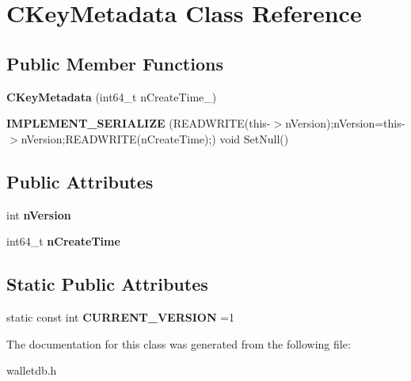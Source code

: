 \hypertarget{class_c_key_metadata}{}\section{C\+Key\+Metadata Class Reference}
\label{class_c_key_metadata}
\subsection*{Public Member Functions}
\begin{DoxyCompactItemize}
\item 
\mbox{\label{class_c_key_metadata_accabc99065b0dbdd8862b4338266893f}} 
{\bfseries C\+Key\+Metadata} (int64\+\_\+t n\+Create\+Time\+\_\+)
\item 
\mbox{\label{class_c_key_metadata_ab3ca9e2a88db731bd690d6a2be6a0b33}} 
{\bfseries I\+M\+P\+L\+E\+M\+E\+N\+T\+\_\+\+S\+E\+R\+I\+A\+L\+I\+ZE} (R\+E\+A\+D\+W\+R\+I\+TE(this-\/$>$n\+Version);n\+Version=this-\/$>$n\+Version;R\+E\+A\+D\+W\+R\+I\+TE(n\+Create\+Time);) void Set\+Null()
\end{DoxyCompactItemize}
\subsection*{Public Attributes}
\begin{DoxyCompactItemize}
\item 
\mbox{\label{class_c_key_metadata_a52f63ceb60b53e491666b6aa59a4d818}} 
int {\bfseries n\+Version}
\item 
\mbox{\label{class_c_key_metadata_accfd31222aefcbdcba1fb0214e546e6d}} 
int64\+\_\+t {\bfseries n\+Create\+Time}
\end{DoxyCompactItemize}
\subsection*{Static Public Attributes}
\begin{DoxyCompactItemize}
\item 
\mbox{\label{class_c_key_metadata_a805f9472960eec81031596ce1133e629}} 
static const int {\bfseries C\+U\+R\+R\+E\+N\+T\+\_\+\+V\+E\+R\+S\+I\+ON} =1
\end{DoxyCompactItemize}


The documentation for this class was generated from the following file\+:\begin{DoxyCompactItemize}
\item 
walletdb.\+h\end{DoxyCompactItemize}
